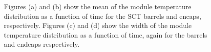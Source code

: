 \begin{figure}[h]
 	\centering
  \caption{Figures (a) and (b) show the mean of the module temperature
  distribution as a function of time for the SCT barrels and encaps,
  respectively. Figures (c) and (d) show the width of the module temperature
  distribution as a function of time, again for the barrels and endcaps
  respectively.}
	\label{fig:sigma-evo-tdiff}
\end{figure}

